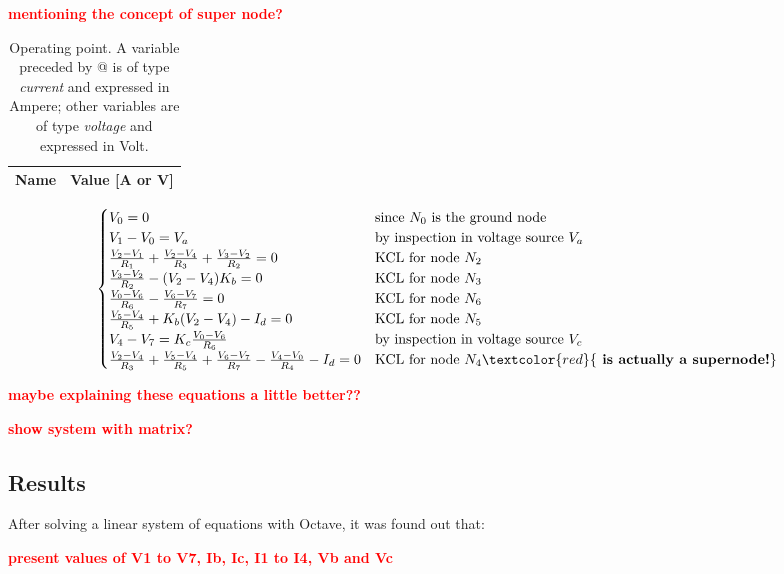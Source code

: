 \par
\textcolor{red}{\textbf{mentioning the concept of super node?}}



\begin{table}[h]
  \centering
  \begin{tabular}{|c|c|}
    \hline    
    {\bf Name} & {\bf Value [A or V]} \\ \hline
    
  \end{tabular}
  \caption{Operating point. A variable preceded by @ is of type {\em current}
    and expressed in Ampere; other variables are of type {\it voltage} and expressed in
    Volt.}
  \label{tab:op}
\end{table}


\begin{equation}
\begin{cases}
V_0 = 0 & \mbox{since $N_0$ is the ground node} \\
V_1-V_0 = V_a & \mbox{by inspection in voltage source $V_a$}  \\
\frac{V_2-V_1}{R_1} + \frac{V_2-V_4}{R_3} + \frac{V_3-V_2}{R_2} = 0 & \mbox{KCL for node $N_2$} \\
\frac{V_3-V_2}{R_2} - (V_2-V_4) K_b = 0 & \mbox{KCL for node $N_3$} \\
\frac{V_0-V_6}{R_6} - \frac{V_6-V_7}{R_7} = 0 & \mbox{KCL for node $N_6$}\\
\frac{V_5-V_4}{R_5} + K_b (V_2 - V_4) - I_d = 0 & \mbox{KCL for node $N_5$}\\
V_4-V_7 = K_c \frac{V_0-V_6}{R_6} & \mbox{by inspection in voltage source $V_c$} \\
\frac{V_2-V_4}{R_3} + \frac{V_5-V_4}{R_5} + \frac{V_6-V_7}{R_7} - \frac{V_4-V_0}{R_4} - I_d = 0 & \mbox{KCL for node $N_4$} \textcolor{red}{\textbf{     is actually a supernode!}}
\end{cases}
\end{equation}

\par
\textcolor{red}{\textbf{maybe explaining these equations a little better??}}
\par
\textcolor{red}{\textbf{show system with matrix?}}






\subsection{Results}
\par
After solving a linear system of equations with Octave, it was found out that:
\par
\textcolor{red}{\textbf{present values of V1 to V7, Ib, Ic, I1 to I4, Vb and Vc}}


